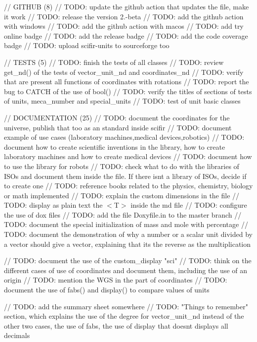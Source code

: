 // GITHUB (8) // TODO\+: update the github action that updates the  file, make it work // TODO\+: release the version 2.-\/beta // TODO\+: add the github action with windows // TODO\+: add the github action with macos // TODO\+: add try online badge // TODO\+: add the release badge // TODO\+: add the code coverage badge // TODO\+: upload scifir-\/units to sourceforge too

// TESTS (5) // TODO\+: finish the tests of all classes // TODO\+: review get\+\_\+nd() of the tests of vector\+\_\+unit\+\_\+nd and coordinates\+\_\+nd // TODO\+: verify that are present all functions of coordinates with rotations // TODO\+: report the bug to CATCH of the use of bool() // TODO\+: verify the titles of sections of tests of units, meca\+\_\+number and special\+\_\+units // TODO\+: test of unit basic classes

// DOCUMENTATION (25) // TODO\+: document the coordinates for the universe, publish that too as an standard inside scifir // TODO\+: document example of use cases (laboratory machines,medical devices,robotics) // TODO\+: document how to create scientific inventions in the library, how to create laboratory machines and how to create medical devices // TODO\+: document how to use the library for robots // TODO\+: check what to do with the libraries of ISOs and document them inside the  file. If there isn\textquotesingle{}t a library of ISOs, decide if to create one // TODO\+: reference books related to the physics, chemistry, biology or math implemented // TODO\+: explain the custom dimensions in the file  // TODO\+: display as plain text the $<$\+T$>$ inside the md file // TODO\+: configure the use of dox files // TODO\+: add the file Doxyfile.\+in to the master branch // TODO\+: document the special initialization of mass and mole with percentage // TODO\+: document the demonstration of why a number or a scalar unit divided by a vector should give a vector, explaining that it\textquotesingle{}s the reverse as the multiplication

// TODO\+: document the use of the custom\+\_\+display "{}sci"{} // TODO\+: think on the different cases of use of coordinates and document them, including the use of an origin // TODO\+: mention the WGS in the part of coordinates // TODO\+: document the use of fabs() and display() to compare values of units

// TODO\+: add the summary sheet somewhere // TODO\+: "{}\+Things to remember"{} section, which explains the use of the degree for vector\+\_\+unit\+\_\+nd instead of the other two cases, the use of fabs, the use of display that doesn\textquotesingle{}t displays all decimals

